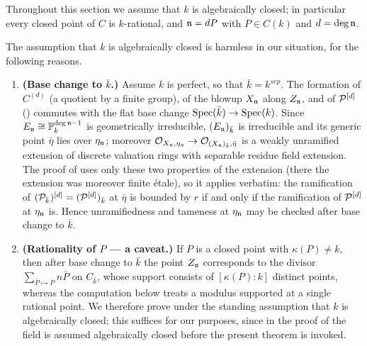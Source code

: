 Throughout this section we assume that $k$ is algebraically closed; in particular every closed point of $C$ is $k$-rational, and $\mathfrak{n} = dP$ with $P \in C(k)$ and $d = \deg \mathfrak{n}$.

\begin{rem*}
    The assumption that $k$ is algebraically closed is harmless in our situation, for the following reasons.
    \begin{enumerate}
        \item \textbf{(Base change to $\bar{k}$.)} Assume $k$ is perfect, so that $\bar{k}=k^{sep}$.
        The formation of $C^{(d)}$ (a quotient by a finite group), of the blowup $X_{\mathfrak{n}}$ along $Z_{\mathfrak{n}}$, and of
        $\mathcal{P}^{[d]}$ () commutes with the flat base change $\operatorname{Spec}(\bar{k}) \to \operatorname{Spec}(k)$.
        Since $E_{\mathfrak{n}} \cong \mathbb{P}^{\deg \mathfrak{n} - 1}_k$ is geometrically irreducible, $(E_{\mathfrak{n}})_{\bar{k}}$ is irreducible
        and its generic point $\bar{\eta}$ lies over $\eta_{\mathfrak{n}}$; moreover
        $\mathcal{O}_{X_{\mathfrak{n}}, \eta_{\mathfrak{n}}} \to \mathcal{O}_{(X_{\mathfrak{n}})_{\bar{k}}, \bar{\eta}}$ is a weakly unramified extension of discrete
        valuation rings with separable residue field extension. The proof of 
        uses only these two properties of the extension (there the extension was moreover finite étale), so it applies
        verbatim: the ramification of $(\mathcal{P}_{\bar{k}})^{[d]} = (\mathcal{P}^{[d]})_{\bar{k}}$ at $\bar{\eta}$ is bounded by $r$ if
        and only if the ramification of $\mathcal{P}^{[d]}$ at $\eta_{\mathfrak{n}}$ is. Hence unramifiedness and tameness at $\eta_{\mathfrak{n}}$
        may be checked after base change to $\bar{k}$.
        \item \textbf{(Rationality of $P$ --- a caveat.)} If $P$ is a closed point with $\kappa(P) \neq k$, then after base
        change to $\bar{k}$ the point $Z_{\mathfrak{n}}$ corresponds to the divisor $\sum_{\bar{P} \mapsto P} n \bar{P}$ on
        $C_{\bar{k}}$, whose support consists of $[\kappa(P):k]$ distinct points, whereas the computation below treats a
        modulus supported at a single rational point. We therefore prove  under
        the standing assumption that $k$ is algebraically closed; this suffices for our purposes, since in the proof of
         the field is assumed algebraically closed before the present
        theorem is invoked.
    \end{enumerate}
\end{rem*}

